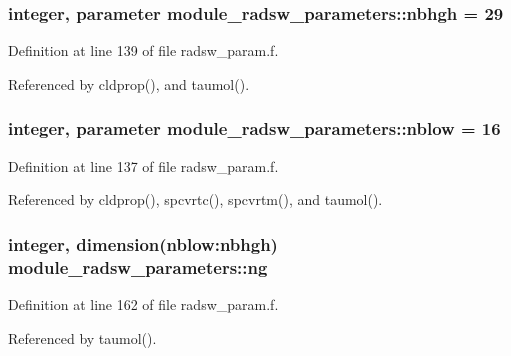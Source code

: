 \subsubsection[{\texorpdfstring{nbhgh}{nbhgh}}]{\setlength{\rightskip}{0pt plus 5cm}integer, parameter module\+\_\+radsw\+\_\+parameters\+::nbhgh = 29}\hypertarget{group__module__radsw__main_ga39e5ca4fd5defbc2545ee39bbf50d61b}{}\label{group__module__radsw__main_ga39e5ca4fd5defbc2545ee39bbf50d61b}


Definition at line 139 of file radsw\+\_\+param.\+f.



Referenced by cldprop(), and taumol().

\subsubsection[{\texorpdfstring{nblow}{nblow}}]{\setlength{\rightskip}{0pt plus 5cm}integer, parameter module\+\_\+radsw\+\_\+parameters\+::nblow = 16}\hypertarget{group__module__radsw__main_ga2c5efc91f02dc0d4bdbd5e490f44c19c}{}\label{group__module__radsw__main_ga2c5efc91f02dc0d4bdbd5e490f44c19c}


Definition at line 137 of file radsw\+\_\+param.\+f.



Referenced by cldprop(), spcvrtc(), spcvrtm(), and taumol().

\subsubsection[{\texorpdfstring{ng}{ng}}]{\setlength{\rightskip}{0pt plus 5cm}integer, dimension(nblow\+:nbhgh) module\+\_\+radsw\+\_\+parameters\+::ng}\hypertarget{group__module__radsw__main_gaff9670cd3f5bef92ca998e491e28986e}{}\label{group__module__radsw__main_gaff9670cd3f5bef92ca998e491e28986e}


Definition at line 162 of file radsw\+\_\+param.\+f.



Referenced by taumol().

